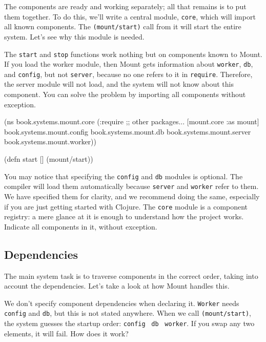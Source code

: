 
The components are ready and working separately; all that remains is to put them together. To do this, we'll write a central module, \verb|core|, which will import all known components. The \verb|(mount/start)| call from it will start the entire system. Let's see why this module is needed.

The \verb|start| and \verb|stop| functions work nothing but on components known to Mount. If you load the worker module, then Mount gets information about \verb|worker|, \verb|db|, and \verb|config|, but not \verb|server|, because no one refers to it in \verb|require|. Therefore, the server module will not load, and the system will not know about this component. You can solve the problem by importing all components without exception.

\label{mount-main}

\begin{english}
  \begin{clojure}
(ns book.systems.mount.core
  (:require
   ;; other packages...
   [mount.core :as mount]
   book.systems.mount.config
   book.systems.mount.db
   book.systems.mount.server
   book.systems.mount.worker))

(defn start []
  (mount/start))
  \end{clojure}
\end{english}

You may notice that specifying the \verb|config| and \verb|db| modules is optional. The compiler will load them automatically because \verb|server| and \verb|worker| refer to them. We have specified them for clarity, and we recommend doing the same, especially if you are just getting started with Clojure. The \verb|core| module is a component registry: a mere glance at it is enough to understand how the project works. Indicate all components in it, without exception.

\subsection{Dependencies}


The main system task is to traverse components in the correct order, taking into account the dependencies. Let's take a look at how Mount handles this.

We don't specify component dependencies when declaring it. \verb|Worker| needs \verb|config| and \verb|db|, but this is not stated anywhere. When we call \verb|(mount/start)|, the system guesses the startup order: \verb|config|~\arr{} \verb|db|~\arr{} \verb|worker|. If you swap any two elements, it will fail. How does it work?

